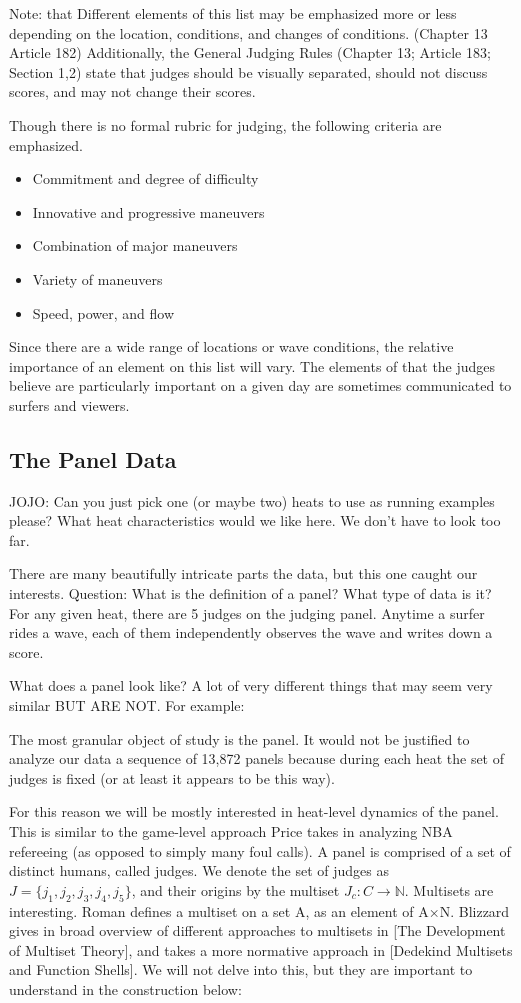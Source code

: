 \documentclass{article}
\theoremstyle{definition}
\begin{document}
Note: that Different elements of this list may be emphasized more or less depending on the location, conditions, and changes of conditions. (Chapter 13 Article 182) Additionally, the General Judging Rules (Chapter 13; Article 183; Section 1,2) state that judges should be visually separated, should not discuss scores, and may not change their scores.

Though there is no formal rubric for judging, the following criteria are emphasized.
\begin{itemize}
\item Commitment and degree of difficulty
\item Innovative and progressive maneuvers
\item Combination of major maneuvers
\item Variety of maneuvers
\item Speed, power, and flow
\end{itemize}
Since there are a wide range of locations or wave conditions, the relative importance of an element on this list will vary. The elements of that the judges believe are particularly important on a given day are sometimes communicated to surfers and viewers.

\subsection{The Panel Data}
JOJO: Can you just pick one (or maybe two) heats to use as running examples please? What heat characteristics would we like here. We don't have to look too far.

There are many beautifully intricate parts the data, but this one caught our interests.
Question: What is the definition of a panel? What type of data is it?
For any given heat, there are 5 judges on the judging panel. Anytime a surfer rides a wave, each of them independently observes the wave and writes down a score. 

What does a panel look like? A lot of very different things that may seem very similar BUT ARE NOT. For example:

The most granular object of study is the panel. It would not be justified to analyze our data a sequence of 13,872 panels because during each heat the set of judges is fixed (or at least it appears to be this way).

For this reason we will be mostly interested in heat-level dynamics of the panel. This is similar to the game-level approach Price takes in analyzing NBA refereeing (as opposed to simply many foul calls). A panel is comprised of a set of distinct humans, called judges. We denote the set of judges as $J=\{j_1, j_2, j_3,j_4, j_5\}$, and their origins by the multiset $J_c:C\rightarrow\mathbb{N}$. Multisets are interesting. Roman defines a multiset on a set A, as an element of A×N. Blizzard gives in broad overview of different approaches to multisets in [The Development of Multiset Theory], and takes a more normative approach in [Dedekind Multisets and Function Shells]. We will not delve into this, but they are important to understand in the construction below:
\end{document}
